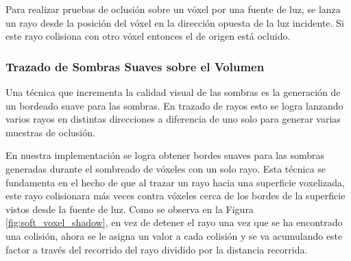 Para realizar pruebas de oclusión sobre un vóxel por una fuente de luz, se lanza un rayo desde la posición del vóxel en la dirección opuesta de la luz incidente. Si este rayo colisiona con otro vóxel entonces el de origen está ocluido.

\subsubsection{Trazado de Sombras Suaves sobre el Volumen}

Una técnica que incrementa la calidad visual de las sombras es la generación de un bordeado suave para las sombras. En trazado de rayos esto se logra lanzando varios rayos en distintas direcciones a diferencia de uno solo para generar varias muestras de oclusión.

En nuestra implementación se logra obtener bordes suaves para las sombras generadas durante el sombreado de vóxeles con un solo rayo. Esta técnica se fundamenta en el hecho de que al trazar un rayo hacia una superficie voxelizada, este rayo colisionara más veces contra vóxeles cerca de los bordes de la superficie vistos desde la fuente de luz. Como se observa en la Figura \ref{fig:soft_voxel_shadow}, en vez de detener el rayo una vez que se ha encontrado una colisión, ahora se le asigna un valor a cada colisión y se va acumulando este factor a través del recorrido del rayo dividido por la distancia recorrida.

